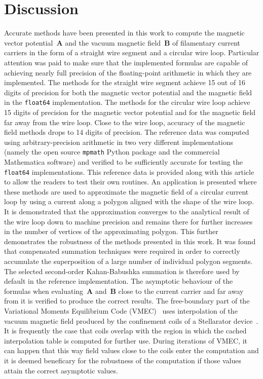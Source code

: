 \section{Discussion}
\label{sec:discussion}
Accurate methods have been presented in this work
to compute the magnetic vector potential~$\mathbf{A}$
and the vacuum magnetic field~$\mathbf{B}$
of filamentary current carriers
in the form of a straight wire segment
and a circular wire loop.
Particular attention was paid to make sure that the implemented formulas
are capable of achieving nearly full precision of the floating-point arithmetic
in which they are implemented.
%
The methods for the straight wire segment
achieve 15 out of 16 digits of precision for both
the magnetic vector potential and the magnetic field
in the \texttt{float64} implementation.
%
The methods for the circular wire loop
achieve 15 digits of precision for the magnetic vector potential
and for the magnetic field far away from the wire loop.
Close to the wire loop, accuracy of the magnetic field methods
drops to 14 digits of precision.
%
The reference data was computed using arbitrary-precision arithmetic
in two very different implementations (namely the open source \texttt{mpmath} Python package
and the commercial Mathematica software) and verified to be sufficiently accurate
for testing the \texttt{float64} implementations.
This reference data is provided along with this article
to allow the readers to test their own routines.
%
An application is presented where these methods
are used to approximate the magnetic field of a circular current loop
by using a current along a polygon aligned with the shape of the wire loop.
It is demonstrated that the approximation converges to the analytical result
of the wire loop down to machine precision and remains there
for further increases in the number of vertices of the approximating polygon.
This further demonstrates the robustness of the methods presented in this work.
It was found that compensated summation techniques were required
in order to correctly accumulate the superposition of a large number
of individual polygon segments.
The selected second-order Kahan-Babushka summation is therefore used by default in the reference implementation.
%
The asymptotic behaviour of the formulas
when evaluating~$\mathbf{A}$ and~$\mathbf{B}$ close to the current carrier
and far away from it is verified to produce the correct results.
%
The free-boundary part of the Variational Moments Equilibrium Code (VMEC)~\cite{hirshman_1986}
uses interpolation of the vacuum magnetic field produced by the confinement coils
of a Stellarator device~\cite{spitzer_1958}.
It is frequently the case that coils overlap with the region
in which the cached interpolation table is computed for further use.
During iterations of VMEC, it can happen that this way
field values close to the coils enter the computation
and it is deemed beneficary for the robustness of the computation
if those values attain the correct asymptotic values.
